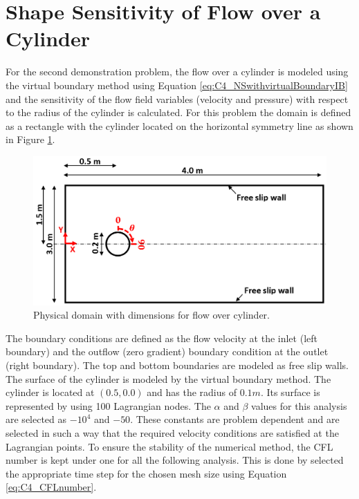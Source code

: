 \section{Shape Sensitivity of Flow over a Cylinder}
For the second demonstration problem, the flow over a cylinder is modeled using the virtual boundary method using Equation \eqref{eq:C4_NSwithvirtualBoundaryIB} and the sensitivity of the flow field variables (velocity and pressure) with respect to the radius of the cylinder is calculated. For this problem the domain is defined as a rectangle with the cylinder located on the horizontal symmetry line as shown in Figure \ref{fig:C4_cylinderPhysicalDomain}.

\begin{figure}[H]
    \centering
    \includegraphics[width=12.00cm]{Chapter_4/figure/flow_over_cylinder/flow_over_cylinder.png}
    \caption{Physical domain with dimensions for flow over cylinder.}
    \label{fig:C4_cylinderPhysicalDomain}
\end{figure}

The boundary conditions are defined as the flow velocity at the inlet (left boundary) and the outflow (zero gradient) boundary condition at the outlet (right boundary). The top and bottom boundaries are modeled as free slip walls. The surface of the cylinder is modeled by the virtual boundary method. The cylinder is located at $(0.5, 0.0)$ and has the radius of $0.1 m$. Its surface is represented by using 100 Lagrangian nodes. The $\alpha$ and $\beta$ values for this analysis are selected as $-10^4$ and $-50$. These constants are problem dependent and are selected in such a way that the required velocity conditions are satisfied at the Lagrangian points. To ensure the stability of the numerical method, the CFL number is kept under one for all the following analysis. This is done by selected the appropriate time step for the chosen mesh size using Equation \eqref{eq:C4_CFLnumber}.

